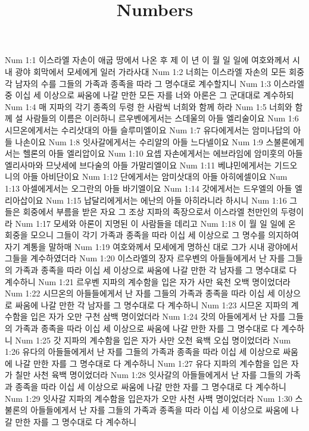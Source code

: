 

\title{Numbers}

Num 1:1  이스라엘 자손이 애굽 땅에서 나온 후 제 이 년 이 월 일 일에 여호와께서 시내 광야 회막에서 모세에게 일러 가라사대
Num 1:2  너희는 이스라엘 자손의 모든 회중 각 남자의 수를 그들의 가족과 종족을 따라 그 명수대로 계수할지니
Num 1:3  이스라엘 중 이십 세 이상으로 싸움에 나갈 만한 모든 자를 너와 아론은 그 군대대로 계수하되
Num 1:4  매 지파의 각기 종족의 두령 한 사람씩 너희와 함께 하라
Num 1:5  너희와 함께 설 사람들의 이름은 이러하니 르우벤에게서는 스데울의 아들 엘리술이요
Num 1:6  시므온에게서는 수리삿대의 아들 슬루미엘이요
Num 1:7  유다에게서는 암미나답의 아들 나손이요
Num 1:8  잇사갈에게서는 수리알의 아들 느다넬이요
Num 1:9  스불론에게서는 헬론의 아들 엘리압이요
Num 1:10  요셉 자손에게서는 에브라임에 암미훗의 아들 엘리사마와 므낫세에 브다술의 아들 가말리엘이요
Num 1:11  베냐민에게서는 기드오니의 아들 아비단이요
Num 1:12  단에게서는 암미삿대의 아들 아히에셀이요
Num 1:13  아셀에게서는 오그란의 아들 바기엘이요
Num 1:14  갓에게서는 드우엘의 아들 엘리아삽이요
Num 1:15  납달리에게서는 에난의 아들 아히라니라 하시니
Num 1:16  그들은 회중에서 부름을 받은 자요 그 조상 지파의 족장으로서 이스라엘 천만인의 두령이라
Num 1:17  모세와 아론이 지명된 이 사람들을 데리고
Num 1:18  이 월 일 일에 온 회중을 모으니 그들이 각기 가족과 종족을 따라 이십 세 이상으로 그 명수를 의지하여 자기 계통을 말하매
Num 1:19  여호와께서 모세에게 명하신 대로 그가 시내 광야에서 그들을 계수하였더라
Num 1:20  이스라엘의 장자 르우벤의 아들들에게서 난 자를 그들의 가족과 종족을 따라 이십 세 이상으로 싸움에 나갈 만한 각 남자를 그 명수대로 다 계수하니
Num 1:21  르우벤 지파의 계수함을 입은 자가 사만 육천 오백 명이었더라
Num 1:22  시므온의 아들들에게서 난 자를 그들의 가족과 종족을 따라 이십 세 이상으로 싸움에 나갈 만한 각 남자를 그 명수대로 다 계수하니
Num 1:23  시므온 지파의 계수함을 입은 자가 오만 구천 삼백 명이었더라
Num 1:24  갓의 아들에게서 난 자를 그들의 가족과 종족을 따라 이십 세 이상으로 싸움에 나갈 만한 자를 그 명수대로 다 계수하니
Num 1:25  갓 지파의 계수함을 입은 자가 사만 오천 육백 오십 명이었더라
Num 1:26  유다의 아들들에게서 난 자를 그들의 가족과 종족을 따라 이십 세 이상으로 싸움에 나갈 만한 자를 그 명수대로 다 계수하니
Num 1:27  유다 지파의 계수함을 입은 자가 칠만 사천 육백 명이었더라
Num 1:28  잇사갈의 아들들에게서 난 자를 그들의 가족과 종족을 따라 이십 세 이상으로 싸움에 나갈 만한 자를 그 명수대로 다 계수하니
Num 1:29  잇사갈 지파의 계수함을 입은자가 오만 사천 사백 명이었더라
Num 1:30  스불론의 아들들에게서 난 자를 그들의 가족과 종족을 따라 이십 세 이상으로 싸움에 나갈 만한 자를 그 명수대로 다 계수하니
